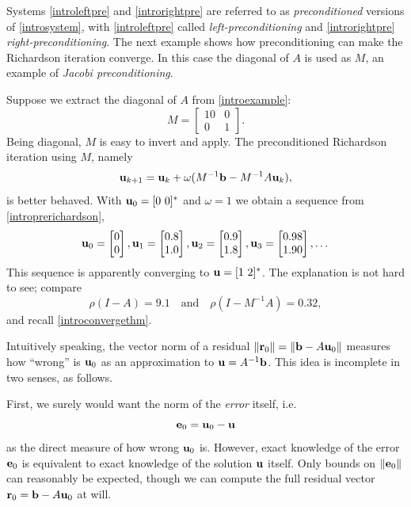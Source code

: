 Systems \eqref{introleftpre} and \eqref{introrightpre} are referred to as \emph{preconditioned} versions of \eqref{introsystem}, with \eqref{introleftpre} called \emph{left-preconditioning} and \eqref{introrightpre} \emph{right-preconditioning}.  The next example shows how preconditioning can make the Richardson iteration converge.  In this case the diagonal of $A$ is used as $M$, an example of \emph{Jacobi preconditioning}.

\medskip\noindent\hrulefill
\begin{examplecont} \label{example:ls:jacobirichardson}  Suppose we extract the diagonal of $A$ from  \eqref{introexample}:
\begin{equation}
M = \begin{bmatrix}
10 & 0 \\ 0 & 1
\end{bmatrix}.  \label{introM}
\end{equation}
Being diagonal, $M$ is easy to invert and apply.  The preconditioned Richardson iteration using $M$, namely
\begin{equation}
\mathbf{u}_{k+1} = \mathbf{u}_k + \omega (M^{-1} \mathbf{b} - M^{-1} A \mathbf{u}_k),  \label{introprerichardson}
\end{equation}
is better behaved.  With $\mathbf{u}_0 = [0\,\, 0]^*$ and $\omega=1$ we obtain a sequence from \eqref{introprerichardson},
\begin{equation}
{\mathbf{u}}_{0} = \begin{bmatrix} 0 \\ 0 \end{bmatrix}, {\mathbf{u}}_{1} = \begin{bmatrix} 0.8 \\ 1.0 \end{bmatrix}, {\mathbf{u}}_{2} = \begin{bmatrix} 0.9 \\ 1.8 \end{bmatrix}, {\mathbf{u}}_{3} = \begin{bmatrix} 0.98 \\ 1.90 \end{bmatrix}, \dots
\end{equation}
This sequence is apparently converging to $\mathbf{u} = [1\,\, 2]^*$.  The explanation is not hard to see; compare
\begin{equation}
\rho(I-A) = 9.1 \quad \text{and} \quad \rho(I-M^{-1} A) = 0.32,
\end{equation}
and recall \eqref{introconvergethm}.
\end{examplecont}
\noindent\hrulefill

\medskip
Intuitively speaking, the vector norm of a residual $\|\mathbf{r}_0\| = \|\mathbf{b} - A \mathbf{u}_0\|$ measures how ``wrong'' is $\mathbf{u}_0$ as an approximation to $\mathbf{u}=A^{-1}\mathbf{b}$.  This idea is incomplete in two senses, as follows.

First, we surely would want the norm of the \emph{error} itself, i.e.
\begin{equation}
\mathbf{e}_0 = \mathbf{u}_0 - \mathbf{u} \label{errordefn}
\end{equation}
as the direct measure of how wrong $\mathbf{u}_0$ is.  However, exact knowledge of the error $\mathbf{e}_0$ is equivalent to exact knowledge of the solution $\mathbf{u}$ itself.  Only bounds on $\|\mathbf{e}_0\|$ can reasonably be expected, though we can compute the full residual vector $\mathbf{r}_0 = \mathbf{b} - A \mathbf{u}_0$ at will.

